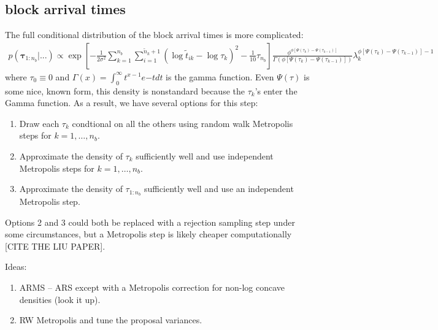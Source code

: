 \documentclass{article}
\begin{document}
\subsection{block arrival times}
The full conditional distribution of the block arrival times is more complicated:
\begin{align*}
p(\bm{\tau}_{1:n_{b}}|...) \propto \exp\left[-\frac{1}{2\sigma^2}\sum_{k=1}^{n_{b}}\sum_{i=1}^{\tilde{n}_k+1}\left(\log\tilde{t}_{ik} - \log\tau_k\right)^2 - \frac{1}{10}\tau_{n_{b}}\right]\frac{\phi^{\phi[\Psi(\tau_k) - \Psi(\tau_{k-1})]}}{\Gamma\left(\phi[\Psi(\tau_k) - \Psi(\tau_{k-1})]\right)}\lambda_k^{\phi[\Psi(\tau_k)-\Psi(\tau_{k-1})] - 1}
\end{align*}
where $\tau_0\equiv0$ and $\Gamma(x) = \int_0^\infty t^{x-1}e{-t}dt$ is the gamma function. Even $\Psi(\tau)$ is some nice, known form, this density is nonstandard because the $\tau_k$'s enter the Gamma function. As a result, we have several options for this step:
\begin{enumerate}
\item Draw each $\tau_k$ condtional on all the others using random walk Metropolis steps for $k=1,\dots,n_{b}$.
\item Approximate the density of $\tau_k$ sufficiently well and use independent Metropolis steps for $k=1,\dots,n_{b}$.
\item Approximate the density of $\tau_{1:n_{b}}$ sufficiently well and use an independent Metropolis step.
\end{enumerate}
Options 2 and 3 could both be replaced with a rejection sampling step under some circumstances, but a Metropolis step is likely cheaper computationally [CITE THE LIU PAPER]. 

Ideas:
\begin{enumerate}
\item ARMS -- ARS except with a Metropolis correction for non-log concave densities (look it up).
\item RW Metropolis and tune the proposal variances.
\end{enumerate}
\end{document}
